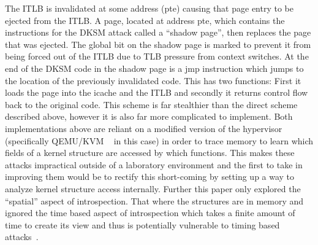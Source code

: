 The ITLB is invalidated at some address (pte) causing that page entry to be ejected from the ITLB. A page, located at address pte, which contains the instructions for the DKSM attack called a ``shadow page'', then replaces the page that was ejected. The global bit on the shadow page is marked to prevent it from being forced out of the ITLB due to TLB pressure from context switches. At the end of the DKSM code in the shadow page is a jmp instruction which jumps to the location of the previously invalidated code. This has two functions: First it loads the page into the icache and the ITLB and secondly it returns control flow back to the original code. This scheme is far stealthier than the direct scheme described above, however it is also far more complicated to implement. Both implementations above are reliant on a modified version of the hypervisor (specifically QEMU/KVM ~\cite{bellard_qemu_2005} in this case) in order to trace memory to learn which fields of a kernel structure are accessed by which functions. This makes these attacks impractical outside of a laboratory environment and the first to take in improving them would be to rectify this short-coming by setting up a way to analyze kernel structure access internally. Further this paper only explored the ``spatial'' aspect of introspection. That where the structures are in memory and ignored the time based aspect of introspection which takes a finite amount of time to create its view and thus is potentially vulnerable to timing based attacks~\cite{bahram_dksm:_2010}. 
